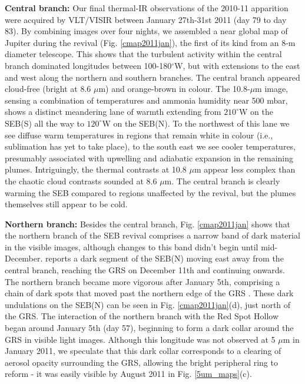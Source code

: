 \documentclass[final,authoryear,5p,times,twocolumn]{elsarticle}
\begin{document}
\textbf{Central branch: } Our final thermal-IR observations of the 2010-11 apparition were acquired by VLT/VISIR between January 27th-31st 2011 (day 79 to day 83).  By combining images over four nights, we assembled a near global map of Jupiter during the revival (Fig. \ref{cmap2011jan}), the first of its kind from an 8-m diameter telescope.  This shows that the turbulent activity within the central branch dominated longitudes between 100-180$^\circ$W, but with extensions to the east and west along the northern and southern branches.  The central branch appeared cloud-free (bright at 8.6 $\mu$m) and orange-brown in colour.  The 10.8-$\mu$m image, sensing a combination of temperatures and ammonia humidity near 500 mbar, shows a distinct meandering lane of warmth extending from $210^\circ$W on the SEB(S) all the way to $120^\circ$W on the SEB(N).  To the northwest of this lane we see diffuse warm temperatures in regions that remain white in colour (i.e., sublimation has yet to take place), to the south east we see cooler temperatures, presumably associated with upwelling and adiabatic expansion in the remaining plumes.  Intriguingly, the thermal contrasts at 10.8 $\mu$m appear less complex than the chaotic cloud contrasts sounded at 8.6 $\mu$m.  The central branch is clearly warming the SEB compared to regions unaffected by the revival, but the plumes themselves still appear to be cold.  

\textbf{Northern branch: } Besides the central branch, Fig. \ref{cmap2011jan} shows that the northern branch of the SEB revival comprises a narrow band of dark material in the visible images, although changes to this band didn't begin until mid-December.  \citet{11rogers_21} reports a dark segment of the SEB(N) moving east away from the central branch, reaching the GRS on December 11th and continuing onwards.  The northern branch became more vigorous after January 5th, comprising a chain of dark spots that moved past the northern edge of the GRS \citep{11rogers_24}.  These dark undulations on the SEB(N) can be seen in Fig. \ref{cmap2011jan}(d), just north of the GRS.  The interaction of the northern branch with the Red Spot Hollow began around January 5th (day 57), beginning to form a dark collar around the GRS in visible light images.  Although this longitude was not observed at 5 $\mu$m in January 2011, we speculate that this dark collar corresponds to a clearing of aerosol opacity surrounding the GRS, allowing the bright peripheral ring to reform - it was easily visible by August 2011 in Fig. \ref{5um_maps}(c).
\end{document}
